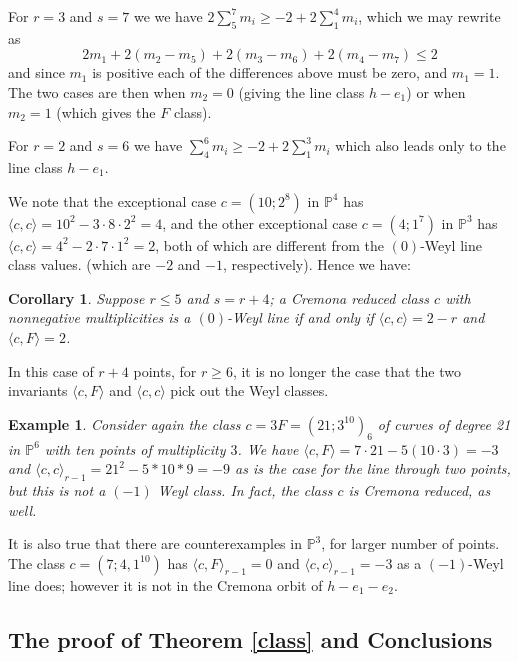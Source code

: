 \documentclass[12pt]{article}
\newtheorem{corollary}[equation]{Corollary}
\newtheorem{example}[equation]{Example}
\numberwithin{equation}{section}
\numberwithin{subeq}{equation}
\def\bbP{\mathbb{P}}
\begin{document}
For $r=3$ and $s=7$ we we have $2\sum_5^7 m_i \geq -2 + 2\sum_1^4 m_i$,
which we may rewrite as
\[
2m_1 + 2(m_2-m_5)+2(m_3-m_6)+2(m_4-m_7) \leq 2
\]
and since $m_1$ is positive each of the differences above must be zero,
and $m_1=1$.
The two cases are then when $m_2=0$ (giving the line class $h-e_1$)
or when $m_2=1$
(which gives the $F$ class).

For $r=2$ and $s=6$ we have $\sum_4^6 m_i \geq -2 + 2\sum_1^3 m_i$
which also leads only to the line class $h-e_1$.


We note that the exceptional case $c = (10;2^8)$ in $\bbP^4$ has
$\langle c,c\rangle = {10}^2-3\cdot 8 \cdot 2^2 = 4$,
and the other exceptional case $c = (4;1^7)$ in $\bbP^3$ has
$\langle c,c\rangle = {4}^2-2\cdot 7 \cdot 1^2 = 2$,
both of which are different from the $(0)$-Weyl line class values.
(which are $-2$ and $-1$, respectively).
Hence we have:

\begin{corollary}
\label{num0classNot2F}
Suppose $r \leq 5$ and $s=r+4$; a Cremona reduced class $c$ with nonnegative multiplicities is a $(0)$-Weyl line if and only if
$\langle c,c\rangle = 2-r$ and $\langle c,F\rangle = 2$.
\end{corollary}


In this case of $r+4$ points, for $r\geq 6$,
it is no longer the case that the two invariants
$ \langle c, F \rangle$ and  $\langle c,c \rangle$
pick out the Weyl classes.

\begin{example}\label{counterex2}
Consider again the class $c = 3F = (21;3^{10})_6$
of curves of degree 21 in $\bbP^6$ with ten points of multiplicity $3$.
We have $ \langle c, F \rangle= 7\cdot 21 - 5(10\cdot 3) =-3$ and
$\langle c,c \rangle_{r-1}=21^2-5*10*9=-9$
as is the case for the line through two points,
but this is not a $(-1)$ Weyl class.
In fact, the class $c$ is Cremona reduced, as well.
\end{example}

It is also true that there are counterexamples in $\bbP^3$, for larger number of points.
The class $c= (7;4,1^{10})$ has
$\langle c,F\rangle_{r-1} = 0$
and
$\langle c,c\rangle_{r-1} = -3$
as a $(-1)$-Weyl line does;
however it is not in the Cremona orbit of $h-e_1-e_2$.

\subsection{The proof of Theorem \ref{class} and Conclusions}
\end{document}
